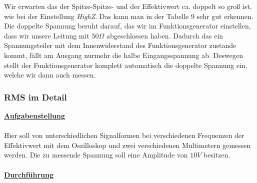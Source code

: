 \documentclass[a4paper,12pt]{article}
\begin{document}
	\newline
	Wir erwarten das der Spitze-Spitze- und der Effektivwert ca. doppelt so groß ist, wie bei der Einstellung \textit{HighZ}. Das kann man in der Tabelle 9 sehr gut erkennen. Die doppelte Spannung beruht darauf, das wir im Funktionsgenerator einstellen, dass wir unsere Leitung mit $50\Omega$ abgeschlossen haben. Dadurch das ein Spannungsteiler mit dem Innenwiderstand des Funktionsgenerator zustande kommt, fällt am Ausgang nurmehr die halbe Eingangsspannung ab. Deswegen stellt der Funktionsgenerator komplett automatisch die doppelte Spannung ein, welche wir dann auch messen.
	\newpage
	\subsubsection{RMS im Detail}
	\underline{\textbf{Aufgabenstellung}}\\ \\
	Hier soll von unterschiedlichen Signalformen bei verschiedenen Frequenzen der Effektivwert mit dem Oszilloskop und zwei verschiedenen Multimetern gemessen werden. Die zu messende Spannung soll eine Amplitude von $10V$ besitzen. \\ \\
	\underline{\textbf{Durchführung}}
\end{document}
